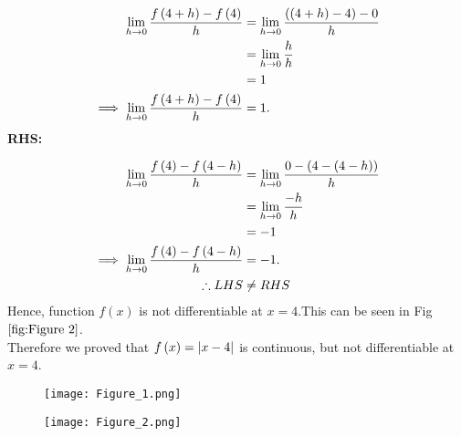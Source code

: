 \documentclass[journal,12pt,twocolumn]{IEEEtran}
\begin{document}
            \begin{align}
                 \lim_{h \to 0}\frac{f\left(4 + h\right) - f\left(4\right)}{h} & = \lim_{h \to 0}\frac{\left(\left(4+h\right) - 4\right) - 0}{h}\\
                                                                   & = \lim_{h \to 0}\frac{h}{h}\\
                                                                   & = 1\\
                 \implies \lim_{h \to 0}\frac{f\left(4 + h\right) - f\left(4\right)}{h} & = 1.
            \end{align}       
 \textbf{RHS:}

            \begin{align}
                 \lim_{h \to 0}\frac{f\left(4\right) - f\left(4-h\right)}{h}  &= \lim_{h \to 0}\frac{0 -\left( 4 - \left(4 -h\right)\right)}{h}\\
                                                                  &= \lim_{h \to 0}\frac{-h}{h}\\
                                                                  & = -1\\
                 \implies  \lim_{h \to 0}\frac{f\left(4\right) - f\left(4-h\right)}{h} &= -1.\\
                 \therefore LHS &\neq RHS \nonumber
            \end{align}
    Hence, function $f(x)$ is not differentiable at $ x = 4 $.This can be seen in Fig $\ref{fig:Figure 2}$.\\
    Therefore we proved that  $ f\left(x\right) = |x-4| $ is continuous, but not differentiable at $ x = 4$.
\begin{figure}[h!]
     \centering
     \texttt{[image: Figure\_1.png]}
     \caption{}
     \label{fig:Figure 1}
\end{figure}
\begin{figure}[h!]
     \centering
     \texttt{[image: Figure\_2.png]}
     \caption{}
     \label{fig:Figure 2}
\end{figure}
\end{document}
